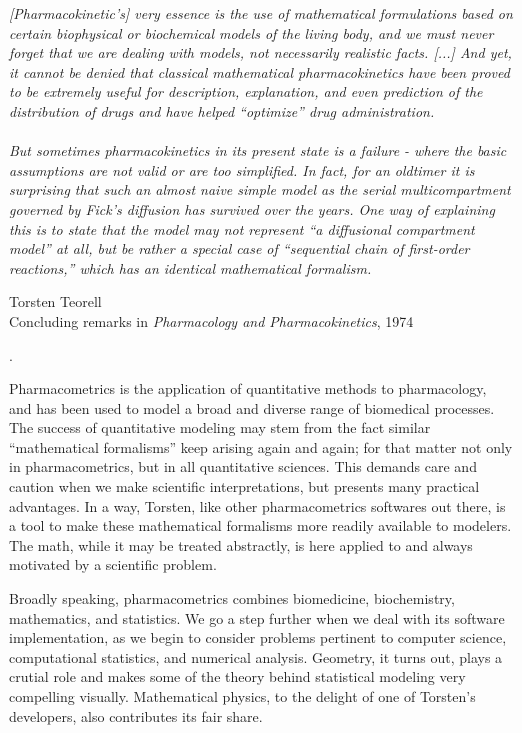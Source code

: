 \documentclass[11pt]{amsart}
\begin{document}
\epigraph{
\textit{[Pharmacokinetic's] very essence is the use of mathematical
formulations based on certain biophysical or biochemical models of the
living body, and we must never forget that we are dealing with models, not necessarily
realistic facts. [...] And yet, it cannot be denied that classical mathematical
pharmacokinetics have been proved to be extremely useful for description,
explanation, and even prediction of the distribution of drugs and have
helped ``optimize'' drug administration. \\ \ \\
But sometimes pharmacokinetics in its present state is a failure - where
the basic assumptions are not valid or are too simplified. In fact, for an
oldtimer it is surprising that such an almost naive simple model as the
serial multicompartment governed by Fick's diffusion has survived over the
years. One way of explaining this is to state that the model may not represent
``a diffusional compartment model'' at all, but be rather a special case of
``sequential chain of first-order reactions,'' which has an identical mathematical
formalism.}}{Torsten Teorell \\ Concluding
remarks in \textit{Pharmacology and Pharmacokinetics}, 1974 \cite{Teorell:1974}}. 


Pharmacometrics is the application of quantitative methods to pharmacology,
and has been used to model a broad and diverse range of biomedical 
processes. The success of quantitative modeling may stem from the
fact similar ``mathematical formalisms'' keep arising again and again; for
that matter not only in pharmacometrics, but in all quantitative sciences.
This demands care and caution when we make scientific interpretations, but
presents many practical advantages. In a way, Torsten, like other pharmacometrics 
softwares out there, is a tool to make these mathematical formalisms more readily 
available to modelers. The math, while it may be treated abstractly, is here applied
to and always motivated by a scientific problem.


Broadly speaking, pharmacometrics
combines biomedicine, biochemistry, mathematics, and statistics. We
go a step further when we deal with its software implementation,
as we begin to consider problems pertinent
to computer science, computational statistics, and numerical analysis. 
Geometry, it turns out, plays a crutial role and makes some of the theory
behind statistical modeling very compelling visually. Mathematical
physics, to the delight of one of Torsten's developers, also contributes
its fair share.
\end{document}
